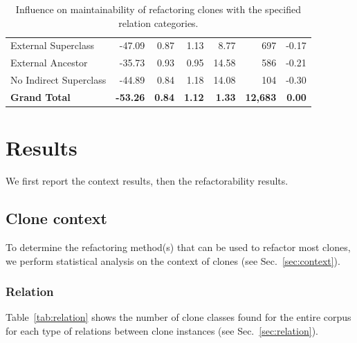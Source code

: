 \documentclass[sigconf,review,anonymous]{acmart}
\begin{document}
\begin{table}
\begin{tabular}{@{}lrrrrrr@{}}
\hspace{10pt} External Superclass & -47.09 & 0.87 & 1.13 & 8.77 & 697 & -0.17 \\
\hspace{10pt} External Ancestor & -35.73 & 0.93 & 0.95 & 14.58 & 586 & -0.21 \\
\hspace{10pt} No Indirect Superclass & -44.89 & 0.84 & 1.18 & 14.08 & 104 & -0.30 \\ \midrule
\textbf{Grand Total} & \textbf{-53.26} & \textbf{0.84} & \textbf{1.12} & \textbf{1.33} & \textbf{12,683} & \textbf{0.00} \\ \bottomrule
\end{tabular}%
\caption{Influence on maintainability of refactoring clones with the specified relation categories.}
\label{tab:relation_refactor}
\end{table}


\section{Results} \label{sec:results}
We first report the context results, then the refactorability results.

\subsection{Clone context}
To determine the refactoring method(s) that can be used to refactor most clones, we perform statistical analysis on the context of clones (see Sec.~\ref{sec:context}).

\subsubsection{Relation}
Table~\ref{tab:relation} shows the number of clone classes found for the entire corpus for each type of relations between clone instances (see Sec.~\ref{sec:relation}).
\end{document}
